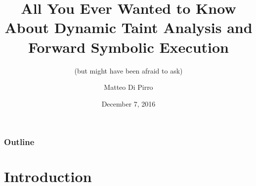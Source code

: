 \documentclass{beamer}
\title{All You Ever Wanted to Know About Dynamic Taint Analysis and Forward Symbolic Execution}
\subtitle{(but might have been afraid to ask)}
\author{Matteo Di Pirro}
\date{December 7, 2016}
\institute{University of Padova}
\begin{document}
\begin{frame}
\titlepage
\end{frame}

\begin{frame}
	\frametitle{Outline}
	\tableofcontents
\end{frame}

\section{Introduction}


\appendix
\makethanks
\end{document}
